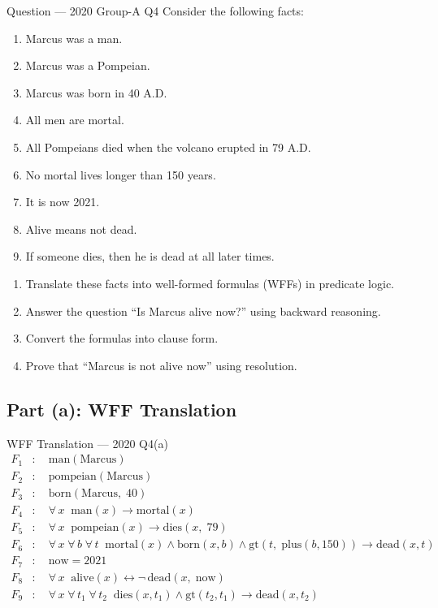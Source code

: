 \documentclass[12pt,a4paper]{article}
\newcommand{\ALL}[1]{\forall\,#1\;}
\newcommand{\ra}{\rightarrow}
\newcommand{\lra}{\leftrightarrow}
\begin{document}
\begin{qbox}{Question --- 2020 Group-A Q4}
Consider the following facts:
\begin{enumerate}[noitemsep,label=(\roman*)]
  \item Marcus was a man.
  \item Marcus was a Pompeian.
  \item Marcus was born in 40 A.D.
  \item All men are mortal.
  \item All Pompeians died when the volcano erupted in 79 A.D.
  \item No mortal lives longer than 150 years.
  \item It is now 2021.
  \item Alive means not dead.
  \item If someone dies, then he is dead at all later times.
\end{enumerate}
\begin{enumerate}[label=(\alph*),noitemsep]
  \item Translate these facts into well-formed formulas (WFFs) in predicate logic.
  \item Answer the question ``Is Marcus alive now?'' using backward reasoning.
  \item Convert the formulas into clause form.
  \item Prove that ``Marcus is not alive now'' using resolution.
\end{enumerate}
\end{qbox}

\subsection{Part (a): WFF Translation}

\begin{solbox}{WFF Translation --- 2020 Q4(a)}
\begin{align*}
  F_1&: \quad \mathrm{man(Marcus)} \\[2pt]
  F_2&: \quad \mathrm{pompeian(Marcus)} \\[2pt]
  F_3&: \quad \mathrm{born(Marcus,\;40)} \\[2pt]
  F_4&: \quad \ALL{x}\;\mathrm{man}(x) \ra \mathrm{mortal}(x) \\[2pt]
  F_5&: \quad \ALL{x}\;\mathrm{pompeian}(x) \ra \mathrm{dies}(x,\;79) \\[2pt]
  F_6&: \quad \ALL{x}\ALL{b}\ALL{t}\;
         \mathrm{mortal}(x) \land \mathrm{born}(x,b) \land \mathrm{gt}(t,\;\mathrm{plus}(b,150))
         \ra \mathrm{dead}(x,t) \\[2pt]
  F_7&: \quad \mathrm{now} = 2021 \\[2pt]
  F_8&: \quad \ALL{x}\;\mathrm{alive}(x) \lra \neg\,\mathrm{dead}(x,\;\mathrm{now}) \\[2pt]
  F_9&: \quad \ALL{x}\ALL{t_1}\ALL{t_2}\;
         \mathrm{dies}(x,t_1) \land \mathrm{gt}(t_2,t_1) \ra \mathrm{dead}(x,t_2)
\end{align*}
\end{solbox}
\end{document}
